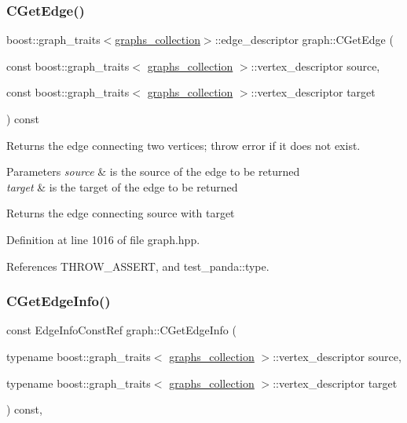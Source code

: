 \subsubsection{\texorpdfstring{C\+Get\+Edge()}{CGetEdge()}}
{\footnotesize\ttfamily boost\+::graph\+\_\+traits$<$\hyperlink{structgraphs__collection}{graphs\+\_\+collection}$>$\+::edge\+\_\+descriptor graph\+::\+C\+Get\+Edge (\begin{DoxyParamCaption}\item[{const boost\+::graph\+\_\+traits$<$ \hyperlink{structgraphs__collection}{graphs\+\_\+collection} $>$\+::vertex\+\_\+descriptor}]{source,  }\item[{const boost\+::graph\+\_\+traits$<$ \hyperlink{structgraphs__collection}{graphs\+\_\+collection} $>$\+::vertex\+\_\+descriptor}]{target }\end{DoxyParamCaption}) const\hspace{0.3cm}{\ttfamily [inline]}}



Returns the edge connecting two vertices; throw error if it does not exist. 


\begin{DoxyParams}{Parameters}
{\em source} & is the source of the edge to be returned \\
\hline
{\em target} & is the target of the edge to be returned \\
\hline
\end{DoxyParams}
\begin{DoxyReturn}{Returns}
the edge connecting source with target 
\end{DoxyReturn}


Definition at line 1016 of file graph.\+hpp.



References T\+H\+R\+O\+W\+\_\+\+A\+S\+S\+E\+RT, and test\+\_\+panda\+::type.

\mbox{\label{structgraph_a342774370b750895ea04187ef9b00969}} 
\subsubsection{\texorpdfstring{C\+Get\+Edge\+Info()}{CGetEdgeInfo()}\hspace{0.1cm}{\footnotesize\ttfamily [1/2]}}
{\footnotesize\ttfamily const Edge\+Info\+Const\+Ref graph\+::\+C\+Get\+Edge\+Info (\begin{DoxyParamCaption}\item[{typename boost\+::graph\+\_\+traits$<$ \hyperlink{structgraphs__collection}{graphs\+\_\+collection} $>$\+::vertex\+\_\+descriptor}]{source,  }\item[{typename boost\+::graph\+\_\+traits$<$ \hyperlink{structgraphs__collection}{graphs\+\_\+collection} $>$\+::vertex\+\_\+descriptor}]{target }\end{DoxyParamCaption}) const\hspace{0.3cm}{\ttfamily [inline]}, {\ttfamily [protected]}}




